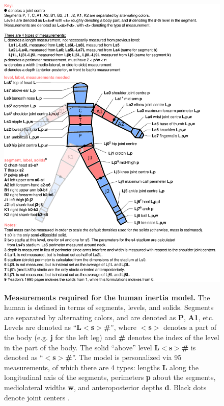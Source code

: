 \documentclass[10pt]{article}
\begin{document}
\begin{figure}[!ht]
  \begin{center}
    \includegraphics[height=6in]{figfactory/measurements.pdf}
  \end{center}
  \caption{
    {\bf Measurements required for the human inertia model.}  The human is
    defined in terms of segments, levels, and solids. Segments are separated by
    alternating colors, and are denoted as \textbf{P}, \textbf{A1}, etc. Levels
    are denoted as ``\textbf{L$<$s$>$\#}'', where \textbf{$<$s$>$} denotes a
    part of the body (e.g. \textbf{j} for the left leg) and \textbf{\#} denotes
    the index of the level in the part of the body. The solid ``above'' level
    \textbf{L$<$s$>$\#} is denoted as ``\textbf{$<$s$>$\#}''. The model is
    personalized via 95 measurements, of which there are 4 types: lengths
    \textbf{L} along the longitudinal axis of the segments, perimeters
    \textbf{p} about the segments, mediolateral widths \textbf{w}, and
    anteroposterior depths \textbf{d}. Black dots denote joint centers
    \cite{Yeadon1990c}.
  }
  \label{fig:meas}
\end{figure}
\end{document}
